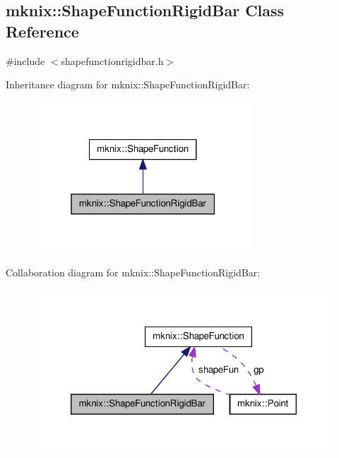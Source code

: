 \hypertarget{classmknix_1_1_shape_function_rigid_bar}{\subsection{mknix\-:\-:Shape\-Function\-Rigid\-Bar Class Reference}
\label{classmknix_1_1_shape_function_rigid_bar}
}


{\ttfamily \#include $<$shapefunctionrigidbar.\-h$>$}



Inheritance diagram for mknix\-:\-:Shape\-Function\-Rigid\-Bar\-:\nopagebreak
\begin{figure}[H]
\begin{center}
\leavevmode
\includegraphics[width=232pt]{da/d15/classmknix_1_1_shape_function_rigid_bar__inherit__graph}
\end{center}
\end{figure}


Collaboration diagram for mknix\-:\-:Shape\-Function\-Rigid\-Bar\-:\nopagebreak
\begin{figure}[H]
\begin{center}
\leavevmode
\includegraphics[width=320pt]{d0/d7c/classmknix_1_1_shape_function_rigid_bar__coll__graph}
\end{center}
\end{figure}
